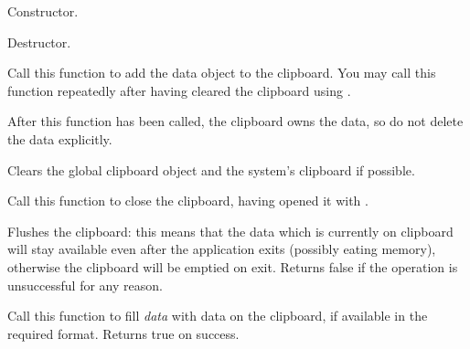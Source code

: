 \label{wxclipboardctor}


Constructor.


\label{wxclipboarddtor}


Destructor.


\label{wxclipboardadddata}


Call this function to add the data object to the clipboard. You may call
this function repeatedly after having cleared the clipboard using .

After this function has been called, the clipboard owns the data, so do not delete
the data explicitly.




\label{wxclipboardclear}


Clears the global clipboard object and the system's clipboard if possible.


\label{wxclipboardclose}


Call this function to close the clipboard, having opened it with .


\label{wxclipboardflush}


Flushes the clipboard: this means that the data which is currently on
clipboard will stay available even after the application exits (possibly
eating memory), otherwise the clipboard will be emptied on exit.
Returns false if the operation is unsuccessful for any reason.


\label{wxclipboardgetdata}


Call this function to fill {\it data} with data on the clipboard, if available in the required
format. Returns true on success.


